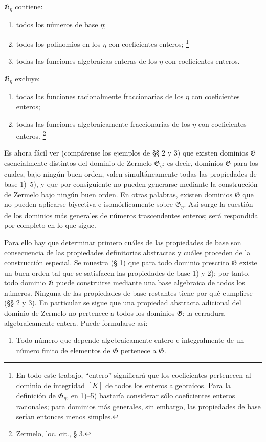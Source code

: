 \documentclass[11pt]{article}
\begin{document}
$\mathfrak G_\eta$ contiene:
\begin{enumerate}
\item[1)] todos los números de base $\eta$;
\item[2)] todos los polinomios en los $\eta$ con coeficientes enteros;
\footnote{En todo este trabajo, ``entero'' significará que los coeficientes pertenecen al dominio de integridad $[K]$ de todos los enteros algebraicos. Para la definición de $\mathfrak G_\eta$, en 1)--5) bastaría considerar sólo coeficientes enteros racionales; para dominios más generales, sin embargo, las propiedades de base serían entonces menos simples.}
\item[3)] todas las funciones algebraicas enteras de los $\eta$ con coeficientes enteros.
\end{enumerate}
$\mathfrak G_\eta$ excluye:
\begin{enumerate}
\item[4)] todas las funciones racionalmente fraccionarias de los $\eta$ con coeficientes enteros;
\item[5)] todas las funciones algebraicamente fraccionarias de los $\eta$ con coeficientes enteros.
\footnote{Zermelo, loc. cit., § 3.}
\end{enumerate}

Es ahora fácil ver (compárense los ejemplos de §§ 2 y 3) que existen dominios $\mathfrak G$ esencialmente distintos del dominio de Zermelo $\mathfrak G_\eta$: es decir, dominios $\mathfrak G$ para los cuales, bajo ningún buen orden, valen simultáneamente todas las propiedades de base 1)--5), y que por consiguiente no pueden generarse mediante la construcción de Zermelo bajo ningún buen orden. En otras palabras, existen dominios $\mathfrak G$ que no pueden aplicarse biyectiva e isomórficamente sobre $\mathfrak G_\eta$. Así surge la cuestión de los dominios más generales de números trascendentes enteros; será respondida por completo en lo que sigue.

Para ello hay que determinar primero cuáles de las propiedades de base son consecuencia de las propiedades definitorias abstractas y cuáles proceden de la construcción especial. Se muestra (§ 1) que para todo dominio prescrito $\mathfrak G$ existe un buen orden tal que se satisfacen las propiedades de base 1) y 2); por tanto, todo dominio $\mathfrak G$ puede construirse mediante una base algebraica de todos los números. Ninguna de las propiedades de base restantes tiene por qué cumplirse (§§ 2 y 3). En particular se sigue que una propiedad abstracta adicional del dominio de Zermelo no pertenece a todos los dominios $\mathfrak G$: la cerradura algebraicamente entera. Puede formularse así:
\begin{enumerate}
\item[V.] Todo número que depende algebraicamente entero e integralmente de un número finito de elementos de $\mathfrak G$ pertenece a $\mathfrak G$.
\end{enumerate}
\end{document}
